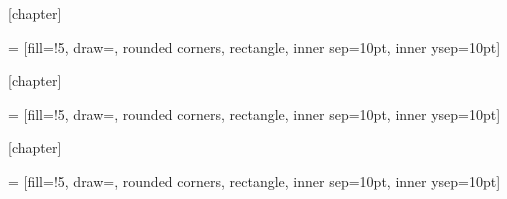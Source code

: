 [chapter]

 = [fill=\propcolorfill!5,
draw=\propcolorborder,
rounded corners,
rectangle, inner sep=10pt, inner ysep=10pt]

\newcommand{\prop}[2][]
{\stepcounter{propcounter}
	\setlength{\netlength}{\textwidth}
	\addtolength{\netlength}{-20pt}
	
	\medskip\noindent
	\begin{tikzpicture}
	\node[pboxstyle] (dbox)
	{\begin{minipage}{\netlength}
		\ifthenelse{\equal{#1}{\empty}}{\smallskip}{\medskip}
		#2
		\end{minipage}
	};
	\node at (dbox.north west) [xshift=2mm, anchor=west, fill=white, text=\propcolorborder, top color=white, bottom color=\propcolorfill!5, rounded corners]
	{\textbf{\large Propriété \arabic{propcounter}}
		\ifthenelse{\equal{#1}{\empty}}{}{{\large(#1)}}
	};
	\end{tikzpicture}
}


[chapter]

 = [fill=\exemplecolorfill!5,
draw=\exemplecolorborder,
rounded corners,
rectangle, inner sep=10pt, inner ysep=10pt]

\newcommand{\exemple}[2][]
{\stepcounter{exemplecounter}
	\setlength{\netlength}{\textwidth}
	\addtolength{\netlength}{-20pt}
	
	\medskip\noindent
	\begin{tikzpicture}
	\node[eboxstyle] (dbox)
	{\begin{minipage}{\netlength}
		\ifthenelse{\equal{#1}{\empty}}{\smallskip}{\medskip}
		#2
		\end{minipage}
	};
	\node at (dbox.north west) [xshift=2mm, anchor=west, fill=white, text=\exemplecolorborder, top color=white, bottom color=\exemplecolorfill!5, rounded corners]
	{\textbf{\large Exemple}
		\ifthenelse{\equal{#1}{\empty}}{}{{\large(#1)}}
	};
	\end{tikzpicture}
}

[chapter]

 = [fill=\activitycolorfill!5,
draw=\activitycolorborder,
rounded corners,
rectangle, inner sep=10pt, inner ysep=10pt]

